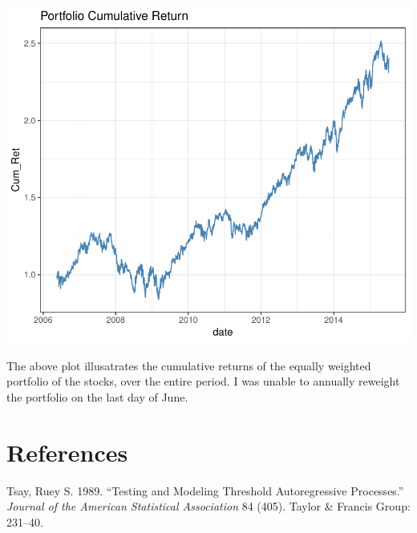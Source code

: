 \documentclass[11pt,preprint, authoryear]{elsarticle}
\let\origfigure\figure
\let\endorigfigure\endfigure
\renewenvironment{figure}[1][2] {
    \expandafter\origfigure\expandafter[H]
} {
    \endorigfigure
}
\numberwithin{equation}{section}
\numberwithin{figure}{section}
\numberwithin{table}{section}
\begin{document}
\begin{figure}[H]

{\centering \includegraphics{Lisa_Tutorial_files/figure-latex/figure2-1} 

}

\caption{Cumulative Plot \label{plot2}}\label{fig:figure2}
\end{figure}

The above plot illusatrates the cumulative returns of the equally
weighted portfolio of the stocks, over the entire period. I was unable
to annually reweight the portfolio on the last day of June.

\newpage

\section*{References}\label{references}

\hypertarget{refs}{}
\hypertarget{ref-tsay1989}{}
Tsay, Ruey S. 1989. ``Testing and Modeling Threshold Autoregressive
Processes.'' \emph{Journal of the American Statistical Association} 84
(405). Taylor \& Francis Group: 231--40.




\end{document}
